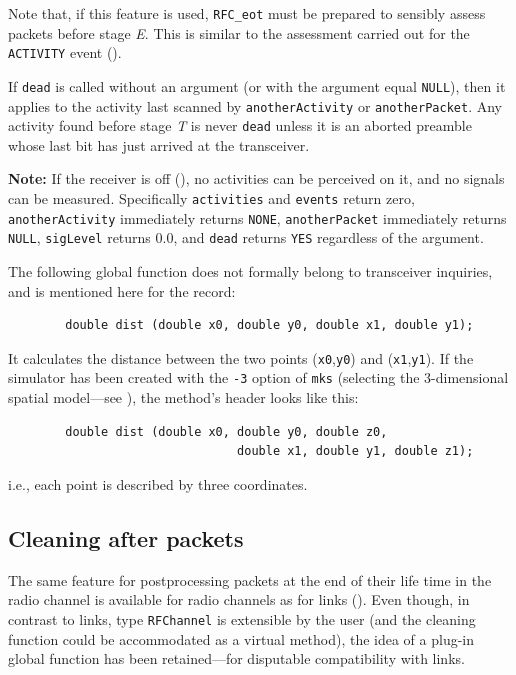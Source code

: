 Note that, if this feature is used, {\tt RFC\_eot} must be prepared to
sensibly assess packets before stage {\em E}.
This is similar to the assessment carried out for the {\tt ACTIVITY}
event ().

If {\tt dead} is called without an argument (or with the argument
equal {\tt NULL}), then it applies to the activity last scanned by
{\tt anotherActivity} or {\tt anotherPacket}.
Any activity found before stage {\em T\/} is never {\tt dead} unless it
is an aborted preamble whose last bit has just arrived at the
transceiver.

\noindent
{\bf Note:}
If the receiver is off (), no activities can be perceived
on it, and no signals can be measured.
Specifically {\tt activities} and {\tt events} return zero,
{\tt anotherActivity} immediately returns {\tt NONE},
{\tt anotherPacket} immediately returns {\tt NULL}, {\tt sigLevel} returns
$0.0$, and {\tt dead} returns {\tt YES} regardless of the argument.

\medskip

The following global function does not formally belong to transceiver
inquiries, and is mentioned here for the record:
\begin{verbatim}
        double dist (double x0, double y0, double x1, double y1);
\end{verbatim}
\noindent
It calculates the distance between the two points ({\tt x0},{\tt y0})
and ({\tt x1},{\tt y1}).
If the simulator has been created with the {\tt -3} option of {\tt mks}
(selecting the 3-dimensional spatial model---see ),
the method's header looks like this:
\begin{verbatim}
        double dist (double x0, double y0, double z0,
                                double x1, double y1, double z1);
\end{verbatim}
\noindent
i.e., each point is described by three coordinates.

\subsection{Cleaning after packets}
\label{rm_tr_cl}

The same feature for postprocessing packets at the end of their life time in
the radio channel is available for radio channels as for links
().
Even though, in contrast to links, type {\tt RFChannel} is extensible by the
user (and the cleaning function could be accommodated as a virtual
method), the idea of a plug-in global function has been retained---for
disputable compatibility with links.

